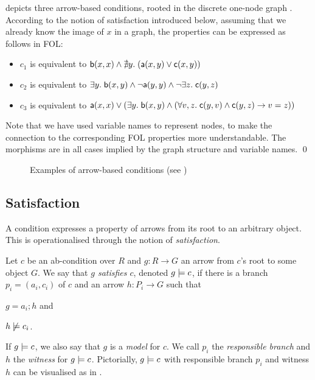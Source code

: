 \begin{example}
 depicts three arrow-based conditions, rooted in the discrete one-node graph . According
to the notion of satisfaction introduced below, assuming that we already know the image of $x$ in a graph, the properties can be expressed as follows in FOL:
\begin{itemize}
\item $c_1$ is equivalent to $\mathsf{b}(x,x)\wedge \nexists y.\;(\mathsf{a}(x,y)\vee \mathsf{c}(x,y))$
\item $c_2$ is equivalent to $\exists y.\; \mathsf{b}(x,y) \wedge \neg \mathsf{a}(y,y)\wedge \neg \exists z.\; \mathsf{c}(y,z)$ 
\item $c_3$ is equivalent to $\mathsf{a}(x,x)\vee (\exists y.\; \mathsf{b}(x,y) \wedge (\forall v,z.\; \mathsf{c}(y,v)\wedge \mathsf{c}(y,z) \rightarrow v=z))$
\end{itemize}
%
Note that we have used variable names to represent nodes, to make the connection to the corresponding FOL properties more understandable. The morphisms are in all cases implied by the graph structure and variable names.
\qed
\end{example}
%
\begin{figure}[t]
\centering

\caption{Examples of arrow-based conditions (see )}
\end{figure}

\subsection{Satisfaction}

A condition expresses a property of arrows from its root to an arbitrary object. This is operationalised through the notion of \emph{satisfaction}.

\begin{definition}
  Let $c$ be an ab-condition over $R$ and $g:R\to G$ an arrow from $c$'s root to some object $G$. We say that \emph{$g$ satisfies $c$}, denoted $g\models c$, if there is a branch $p_i=(a_i,c_i)$ of $c$ and an arrow $h:P_i\to G$ such that
  \begin{enumerate*}
  \item $g=a_i;h$ and
  \item $h\not\models c_i$.
  \end{enumerate*}
\end{definition}
%
If $g\models c$, we also say that $g$ is a \emph{model} for $c$. We call $p_i$ the \emph{responsible branch} and $h$ the \emph{witness} for $g\models c$. Pictorially, $g\models c$ with responsible branch $p_i$ and witness $h$ can be visualised as in .

